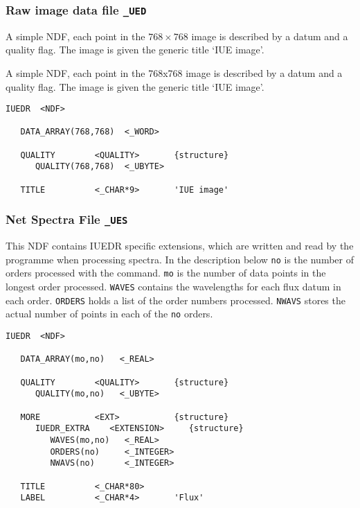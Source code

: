 \subsubsection{Raw image data file {\tt \_UED}}

\begin{latexonly}
A simple NDF, each point in the $768\times 768$ image is described by a datum
and a quality flag.  The image is given the generic title `IUE image'\@.
\end{latexonly}

\begin{htmlonly}
A simple NDF, each point in the 768x768 image is described by a datum
and a quality flag.  The image is given the generic title `IUE image'.
\end{htmlonly}

\begin{verbatim}
IUEDR  <NDF>

   DATA_ARRAY(768,768)  <_WORD>

   QUALITY        <QUALITY>       {structure}
      QUALITY(768,768)  <_UBYTE>

   TITLE          <_CHAR*9>       'IUE image'
\end{verbatim}

\subsubsection{Net Spectra File {\tt \_UES}}

This NDF contains IUEDR specific extensions, which are written and read by the
programme when processing spectra.  In the description below {\tt no} is
the number of orders processed with the 
 command.  {\tt mo} is
the number of data points in the longest order processed.
{\tt WAVES} contains the wavelengths for each flux datum in each order.
{\tt ORDERS} holds a list of the order numbers processed.
{\tt NWAVS} stores the actual number of points in each of the {\tt no} orders.

\begin{verbatim}
IUEDR  <NDF>

   DATA_ARRAY(mo,no)   <_REAL>

   QUALITY        <QUALITY>       {structure}
      QUALITY(mo,no)   <_UBYTE>

   MORE           <EXT>           {structure}
      IUEDR_EXTRA    <EXTENSION>     {structure}
         WAVES(mo,no)   <_REAL>
         ORDERS(no)     <_INTEGER>
         NWAVS(no)      <_INTEGER>

   TITLE          <_CHAR*80>
   LABEL          <_CHAR*4>       'Flux'
\end{verbatim}

